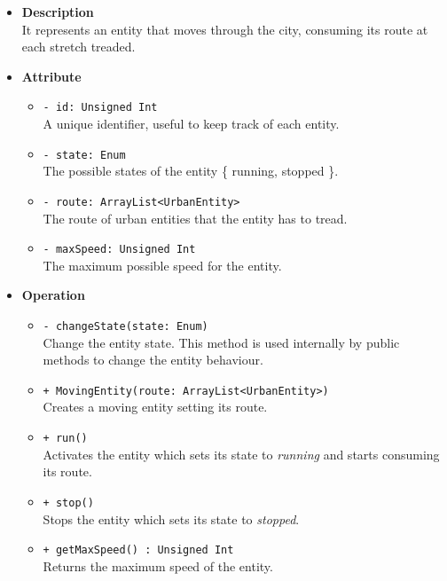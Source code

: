 \begin{itemize}
  \item \textbf{Description} \\
    It represents an entity that moves through the city, consuming its 
route at each stretch treaded.
  \item \textbf{Attribute}
  \begin{itemize}
    \item \texttt{- id: Unsigned Int} \\
A unique identifier, useful to keep track of each entity.
    \item \texttt{- state: Enum} \\
The possible states of the entity \{ running, stopped \}.
    \item \texttt{- route: ArrayList<UrbanEntity>} \\
The route of urban entities that the entity has to tread.
    \item \texttt{- maxSpeed: Unsigned Int} \\
The maximum possible speed for the entity.
  \end{itemize}
  \item \textbf{Operation}
  \begin{itemize}
    \item \texttt{- changeState(state: Enum)} \\
Change the entity state. This method is used internally by public methods to 
change the entity behaviour.
    \item  \texttt{+ MovingEntity(route: ArrayList<UrbanEntity>)} \\
Creates a moving entity setting its route.
    \item  \texttt{+ run()} \\
Activates the entity which sets its state to \textit{running} and 
starts consuming its route.
    \item  \texttt{+ stop()} \\
Stops the entity which sets its state to \textit{stopped}.
    \item  \texttt{+ getMaxSpeed() : Unsigned Int} \\
Returns the maximum speed of the entity.
  \end{itemize}
\end{itemize}

